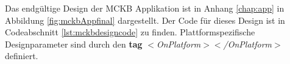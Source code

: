 	Das endgültige Design der MCKB Applikation ist in Anhang \ref{chap:app} in Abbildung \ref{fig:mckbAppfinal} dargestellt. Der Code für dieses Design ist in Codeabschnitt \ref{lst:mckbdesigncode} zu finden. Plattformspezifische Designparameter sind durch den \textbf{tag} \textit{$<$OnPlatform$><$/OnPlatform$>$} definiert. 




